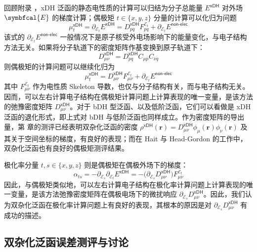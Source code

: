 回顾附录 ，xDH 泛函的静态电性质的计算可以归结为分子总能量 $E^\textsf{xDH}$ 对外场 $\symbfcal{E}$ 的梯度计算；偶极矩 $t \in \{ x, y, z \}$ 分量的计算可以化归为问题
\begin{equation*}
    \mu_t^\textsf{xDH} = \partial_{\mathcal{E}_t} E^\textsf{xDH} = D_{pq}^\textsf{xDH} F_{pq}^{\mathcal{E}_t} + \partial_{\mathcal{E}_t} E^\textsf{non-elec}
\end{equation*}
该式的 $\partial_{\mathcal{E}_t} E^\textsf{non-elec}$ 一般情况下是原子核受外电场影响下的能量变化，与电子结构方法无关。如果将分子轨道下的密度矩阵作基变换到原子轨道下：
\begin{equation*}
    D_{\mu \nu}^\textsf{xDH} = D_{pq}^\textsf{xDH} C_{\mu p} C_{\nu q}
\end{equation*}
则偶极矩的计算问题可以继续化归为
\begin{equation}
    \mu_t^\textsf{xDH} = D_{\mu \nu}^\textsf{xDH} F_{\mu \nu}^{\mathcal{E}_t} + \partial_{\mathcal{E}_t} E^\textsf{non-elec}
\end{equation}
其中 $F_{\mu \nu}^{\mathcal{E}_t}$ 作为电性质 Skeleton 导数，也仅与分子结构有关，而与电子结构无关。因而，可以左右计算电子结构在偶极矩计算问题上计算表现的唯一变量，是该方法的弛豫密度矩阵 $D_{\mu \nu}^\textsf{xDH}$。对于 bDH 型泛函、以及低阶泛函，它们可以看做是 xDH 泛函的退化形式，即上式对 bDH 与低阶泛函也同样成立。作为密度矩阵的导出量，第  章的测评已经表明双杂化泛函的密度 $\rho^\textsf{xDH} (\bm{r}) = D_{\mu \nu}^\textsf{xDH} \phi_\mu (\bm{r}) \phi_\nu (\bm{r})$ 及其关于空间坐标的梯度，有良好的表现；而在 Hait 与 Head-Gordon 的工作\cite{Hait-Head-Gordon.JCTC.2018}中，双杂化泛函也有良好的偶极矩测评结果。

极化率分量 $t, s \in \{ x, y, z \}$ 则是偶极矩在偶极外场下的梯度：
\begin{equation*}
    \alpha_{ts} = - \partial_{\mathcal{E}_s} \partial_{\mathcal{E}_t} E^\textsf{xDH} = - \big( \partial_{\mathcal{E}_s} D_{\mu \nu}^\textsf{xDH} \big) F_{\mu \nu}^{\mathcal{E}_t}
\end{equation*}
因此，与偶极矩类似地，可以左右计算电子结构在极化率计算问题上计算表现的唯一变量，是该方法弛豫密度矩阵在偶极电场下的微扰响应 $\partial_{\mathcal{E}_s} D_{\mu \nu}^\textsf{xDH}$。因此，我们认为双杂化泛函在极化率计算问题上有良好的表现，其根本的原因是对 $\partial_{\mathcal{E}_s} D_{\mu \nu}^\textsf{xDH}$ 有成功的描述。

\subsection{双杂化泛函误差测评与讨论}

